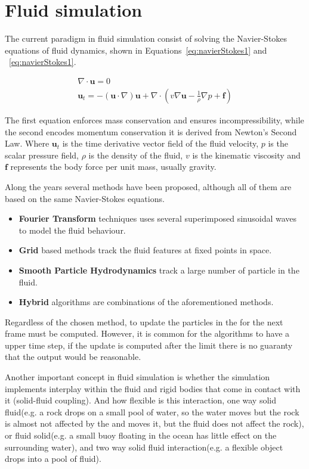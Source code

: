 \section{Fluid simulation}
\label{prevWorkFluidSim}

The current paradigm in fluid simulation consist of solving the Navier-Stokes equations of fluid dynamics, shown in Equations~\ref{eq:navierStokes1} and  ~\ref{eq:navierStokes1}.

\begin{gather}
\label{eq:navierStokes1}
\nabla \cdot \mathbf{u} = 0\\
\label{eq:navierStokes2}
\mathbf{u}_t = -(\mathbf{u} \cdot \nabla)\mathbf{u} + \nabla \cdot ( v \nabla \mathbf{u} - \frac{1}{\rho} \nabla p + \mathbf{f} )
\end{gather}

The first equation enforces mass conservation and ensures incompressibility, while the second encodes momentum conservation it is derived from Newton's Second Law.
Where $\mathbf{u}_t$ is the time derivative vector field of the fluid velocity, $p$  is the scalar pressure field, $\rho$ is the density of the fluid, $v$ is the kinematic viscosity and $\mathbf{f}$ represents the body force per unit mass, usually gravity.

Along the years several methods have been proposed, although all of them are based on the same Navier-Stokes equations.

\begin{itemize}
\item \textbf{Fourier Transform} techniques uses several superimposed sinusoidal waves to model the fluid behaviour.
\item \textbf{Grid} based methods track the fluid features at fixed points in space.
\item \textbf{Smooth Particle Hydrodynamics} track a large number of particle in the fluid.
\item \textbf{Hybrid} algorithms are combinations of the aforementioned methods.
\end{itemize}

Regardless of the chosen method, to update the particles in the for the next frame must be computed.
However, it is common for the algorithms to have a upper time step, if the update is computed after the limit there is no guaranty that the output would be reasonable.

Another important concept in fluid simulation is whether the simulation implements interplay within the fluid and rigid bodies that come in contact with it (solid-fluid coupling).
And how flexible is this interaction, one way solid fluid(e.g. a rock drops on a small pool of water, so the water moves but the rock is almost not affected by the  and moves it, but the fluid does not affect the rock), or fluid solid(e.g. a small buoy floating in the ocean has little effect on the surrounding water), and two way solid fluid interaction(e.g. a flexible object drops into a pool of fluid).

